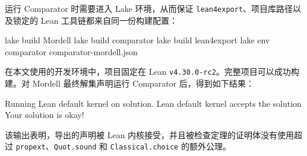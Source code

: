 运行 Comparator 时需要进入 Lake 环境，从而保证 \texttt{lean4export}、项目库路径以及锁定的 Lean 工具链都来自同一份构建配置：

\begin{leanlisting}
lake build Mordell
lake build comparator
lake build lean4export
lake env comparator comparator-mordell.json
\end{leanlisting}

在本文使用的开发环境中，项目固定在 Lean \texttt{v4.30.0-rc2}。完整项目可以成功构建。对 Mordell 最终解集声明运行 Comparator 后，得到如下结果：

\begin{leanlisting}
Running Lean default kernel on solution.
Lean default kernel accepts the solution
Your solution is okay!
\end{leanlisting}

该输出表明，导出的声明被 Lean 内核接受，并且被检查定理的证明体没有使用超过 \texttt{propext}、\texttt{Quot.sound} 和 \texttt{Classical.choice} 的额外公理。
\endgroup

